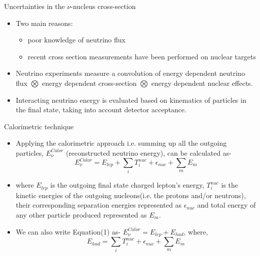 \documentclass[9pt]{beamer}    %
\begin{document}
\begin{frame}{Uncertainties in the $\nu$-nucleus cross-section}
\begin{itemize}
 \item Two main reasons:
 \begin{itemize}
  \item poor knowledge of neutrino flux
  \item recent cross section measurements have been performed on nuclear targets
 \end{itemize}
 \item Neutrino experiments measure a convolution of energy dependent neutrino flux $\bigotimes$ energy dependent cross-section $\bigotimes$ energy dependent nuclear effects.
 \item Interacting neutrino energy is evaluated based on kinematics of particles in the final state, taking into account detector acceptance.

\end{itemize}
\end{frame}



\begin{frame}{Calorimetric technique}
\begin{itemize}
 \item Applying the calorimetric approach i.e. summing up all the outgoing particles, $E_{\nu}^{Calor}$ (reconstructed neutrino energy), can be calculated as-
\begin{equation}
 E_{\nu}^{Calor} = E_{lep}+ \sum \limits_{i} T_{i}^{nuc} + \epsilon_{nuc} + \sum \limits_{m} E_{m}
\end{equation}
\item where $E_{lep}$ is the outgoing final state charged lepton's energy, $T_{i}^{nuc}$ is the kinetic energies of the outgoing nucleons(i.e. the protons and/or neutrons), their corresponding separation energies represented as $\epsilon_{nuc}$ and total energy of any other particle produced represented as $E_{m}$.
\item We can also write Equation(1) as- $E_{\nu}^{Calor} = E_{lep}+E_{had}$, where,
\begin{equation}
 E_{had} = \sum \limits_{i} T_{i}^{nuc} + \epsilon_{nuc} + \sum \limits_{m} E_{m}
\end{equation}
\end{itemize}
\end{frame}
\end{document}
